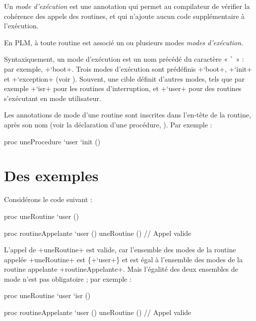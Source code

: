 





Un \emph{mode d'exécution} est une annotation qui permet au compilateur de vérifier la cohérence des appels des routines, et qui n'ajoute aucun code supplémentaire à l'exécution.

En PLM, à toute routine est associé un ou plusieurs modes \emph{modes d'exécution}.

Syntaxiquement, un mode d'exécution est un nom précédé du caractère « \texttt{\`} » : par exemple, \plm+`boot+. Trois modes d'exécution sont prédéfinis \plm+`boot+, \plm+`init+ et \plm+`exception+ (voir ). Souvent, une cible définit d'autres modes, tels que par exemple \plm+`isr+ pour les routines d'interruption, et \plm+`user+ pour des routines s'exécutant en mode utilisateur.

Les annotations de mode d'une routine sont inscrites dans l'en-tête de la routine, après son nom (voir la déclaration d'une procédure, ). Par exemple :

\begin{PLM}
proc uneProcedure `user `init () {
}
\end{PLM}


\section{Des exemples}

Considérons le code suivant :
\begin{PLM}
proc uneRoutine `user () {
}

proc routineAppelante `user () {
  uneRoutine () // Appel valide
}
\end{PLM}

L'appel de \plm+uneRoutine+ est valide, car l'ensemble des modes de la routine appelée \plm+uneRoutine+ est \{\plm+`user+\} et est égal à l'ensemble des modes de la routine appelante \plm+routineAppelante+. Mais l'égalité des deux ensembles de mode n'est pas obligatoire ; par exemple :

\begin{PLM}
proc uneRoutine `user `isr () {
}

proc routineAppelante `user () {
  uneRoutine () // Appel valide
}
\end{PLM}


